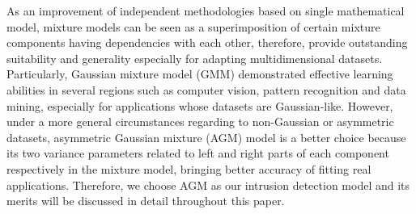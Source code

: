 \documentclass[conference]{IEEEtran}
\begin{document}
As an improvement of independent methodologies based on single mathematical model, mixture models \cite{Yang2015,Wen2015,Bouguila2011a} can be seen as a superimposition of certain mixture components having dependencies with each other, therefore, provide outstanding suitability and generality especially for adapting multidimensional datasets. Particularly, Gaussian mixture model (GMM)\cite{Richardson1997} demonstrated effective learning abilities in several regions such as computer vision, pattern recognition and data mining, especially for applications whose datasets are Gaussian-like. However, under a more general circumstances regarding to non-Gaussian or asymmetric datasets, asymmetric Gaussian mixture (AGM) model \cite{Elguebaly2014} is a better choice because its two variance parameters related to left and right parts of each component respectively in the mixture model, bringing better accuracy of fitting real applications. Therefore, we choose AGM as our intrusion detection model and its merits will be discussed in detail throughout this paper.
\end{document}
